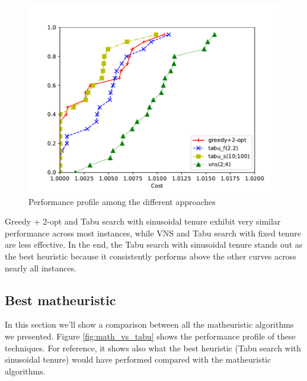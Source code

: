 \documentclass{article}
\begin{document}
\begin{figure}[ht]
        \caption{Performance profile among the different approaches}
        \label{fig:res_bestheu}
        \centering
        \includegraphics[width=340pt]{assets/res_bestheu.pdf}
\end{figure}

Greedy + 2-opt and Tabu search with sinusoidal tenure exhibit very similar performance
across most instances, while VNS and Tabu search with fixed tenure are less effective.
In the end, the Tabu search with sinusoidal tenure stands out as the best heuristic
because it consistently performs above the other curves across nearly all
instances.

\clearpage
\newpage

\subsection{Best matheuristic}
In this section we'll show a comparison between all the matheuristic algorithms
we presented.
Figure \ref{fig:math_vs_tabu} shows the performance profile of these techniques.
For reference, it shows also what the best heuristic (Tabu search with sinusoidal tenure)
would have performed compared with the matheuristic algorithms.
\end{document}
